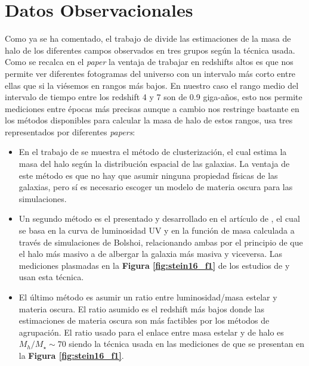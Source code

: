 \section{Datos Observacionales}
Como ya se ha comentado, el trabajo de \cite{steinhardt2016impossibly} divide las estimaciones de la masa de halo de los diferentes campos observados en tres grupos según la técnica usada. Como se recalca en el \textit{paper} \cite{steinhardt2016impossibly} la ventaja de trabajar en redshifts altos es que nos permite ver diferentes fotogramas del universo con un intervalo más corto entre ellas que si la viésemos en rangos más bajos. En nuestro caso el rango medio del intervalo de tiempo entre los redshift 4 y 7 son de 0.9 giga-años, esto nos permite mediciones entre épocas más precisas aunque a cambio nos restringe bastante en los métodos disponibles para calcular la masa de halo de estos rangos, \cite{steinhardt2016impossibly} usa tres representados por diferentes \textit{papers}:
\begin{itemize}
	\item En el trabajo de \cite{hildebrandt2009cars} se muestra el método de clusterización, el cual estima la masa del halo según la distribución espacial de las galaxias. La ventaja de este método es que no hay que asumir ninguna propiedad físicas de las galaxias, pero sí es necesario escoger un modelo de materia oscura para las simulaciones.
	
	\item Un segundo método es el presentado y desarrollado en el artículo de \cite{finkelstein2015increasing}, el cual se basa en la curva de luminosidad UV y en la función de masa calculada a través de simulaciones de Bolshoi, relacionando ambas por el principio de que el halo más masivo a de albergar la galaxia más masiva y viceversa. Las mediciones plasmadas en la \textbf{Figura \ref{fig:stein16_f1}} de los estudios de \cite{bouwens2015reionization} y \cite{bouwens2015uv} usan esta técnica.
	
	\item El último método es asumir un ratio entre luminosidad/masa estelar y materia oscura. El ratio asumido es el redshift más bajos donde las estimaciones de materia oscura son más factibles por los métodos de agrupación. El ratio usado para el enlace entre masa estelar y de halo es $M_h/M_\star \sim 70 $ siendo la técnica usada en las mediciones de \cite{steinhardt2014uniform} que se presentan en la \textbf{Figura \ref{fig:stein16_f1}}.
\end{itemize}

